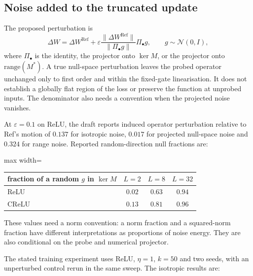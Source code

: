 \documentclass{article}
\theoremstyle{definition}
\theoremstyle{remark}
\begin{document}
\subsection{Noise added to the truncated update}\label{app:e20}

The proposed perturbation is
\[
 \Delta W=\Delta W^{\mathrm{Ref}}+
 \varepsilon\frac{\|\Delta W^{\mathrm{Ref}}\|}{\|\Pi_\bullet g\|}\Pi_\bullet g,
 \qquad g\sim\mathcal N(0,I),
\]
where $\Pi_\bullet$ is the identity, the projector onto $\ker M$, or the projector onto $\mathrm{range}(M^*)$. A true null-space perturbation leaves the probed operator unchanged only to first order and within the fixed-gate linearisation. It does not establish a globally flat region of the loss or preserve the function at unprobed inputs. The denominator also needs a convention when the projected noise vanishes.

At $\varepsilon=0.1$ on ReLU, the draft reports induced operator perturbation relative to Ref's motion of $0.137$ for isotropic noise, $0.017$ for projected null-space noise and $0.324$ for range noise. Reported random-direction null fractions are:

\begin{center}\small
\begin{adjustbox}{max width=\linewidth}
\begin{tabular}{lccc}
\toprule
fraction of a random $g$ in $\ker M$ & $L=2$ & $L=8$ & $L=32$ \\
\midrule
ReLU  & $0.02$ & $0.63$ & $0.94$ \\
CReLU & $0.13$ & $0.81$ & $0.96$ \\
\bottomrule
\end{tabular}
\end{adjustbox}
\end{center}

These values need a norm convention: a norm fraction and a squared-norm fraction have different interpretations as proportions of noise energy. They are also conditional on the probe and numerical projector.

The stated training experiment uses ReLU, $\eta=1$, $k=50$ and two seeds, with an unperturbed control rerun in the same sweep. The isotropic results are:
\end{document}
